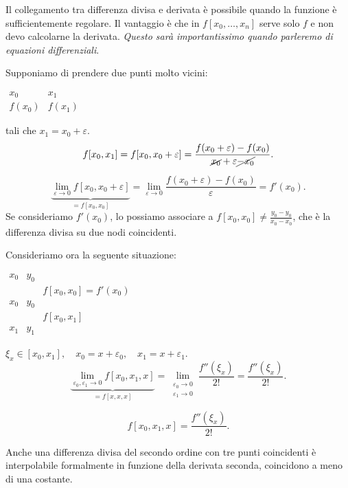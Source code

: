 Il collegamento tra differenza divisa e derivata è possibile quando la
funzione
è sufficientemente regolare. Il vantaggio è che in $f[x_0, \ldots, x_n]$
serve solo $f$ e non devo calcolarne la derivata. \emph{Questo sarà
importantissimo quando parleremo di equazioni differenziali}.

\begin{exe}Supponiamo di prendere due punti molto vicini:
\begin{flushleft}$\begin{array}{cc}
x_0 & x_1 \\
f(x_0) & f(x_1)
\end{array}$\end{flushleft}
tali che $x_1 = x_0 + \varepsilon$.
\[
f[x_0,x_1] = f[x_0,x_0+\varepsilon] = \frac{f(x_0+\varepsilon) -
f(x_0)}{\cancel{x_0} + \varepsilon \cancel{- x_0}}.
\]

\[
\underbrace{\lim_{\varepsilon \to 0}f[x_0,x_0+\varepsilon]}_{= f[x_0,x_0]} =
\lim_{\varepsilon \to 0}\frac{f(x_0+\varepsilon) - f(x_0)}{\varepsilon} =
f'(x_0).
\]
Se consideriamo $f'(x_0)$, lo possiamo associare a $f[x_0,x_0] \neq
\frac{y_0 -y_0}{x_0-x_0}$, che è la differenza divisa su due nodi coincidenti.

\end{exe}

Consideriamo ora la seguente situazione:
\begin{flushleft}$\begin{array}{cccc}
x_0 & y_0 &  &  \\
    &     & f[x_0,x_0] = f'(x_0) & \\
x_0 & y_0 &  &  \\
    &     &  f[x_0,x_1] & \\
x_1 & y_1 &
\end{array}$\end{flushleft}

$\xi_x \in [x_0, x_1], \quad x_0 = x + \varepsilon_0, \quad x_1 = x +
\varepsilon_1$.
\[
\underbrace{\lim_{\varepsilon_0,\varepsilon_1 \to 0}f[x_0,x_1,x]}_{= f[x,x,x]} =
\lim_{\substack{\varepsilon_0 \to 0 \\\varepsilon_1 \to 0}} \frac{f''(\xi_x)}{2!}
= \frac{f''(\xi_x)}{2!}.
\]

\[f[x_0,x_1,x] = \frac{f''(\xi_x)}{2!}.\]

Anche una differenza divisa del secondo ordine con tre punti coincidenti è
interpolabile formalmente in funzione della derivata seconda, coincidono
a meno di una costante.

